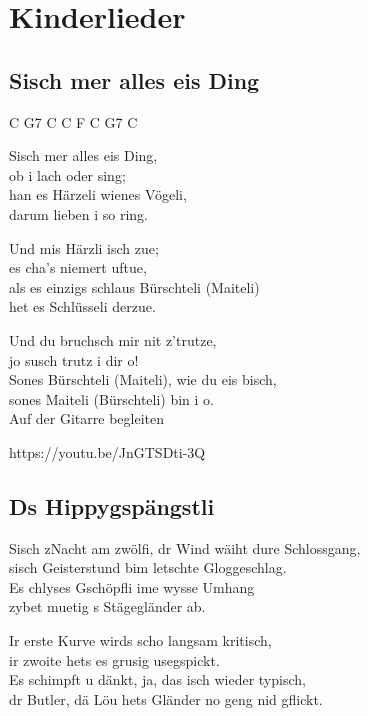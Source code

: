 \documentclass[
  letterpaper,
]{scrbook}
\begin{document}
\part{Kinderlieder}

\hypertarget{sisch-mer-alles-eis-ding}{%
\chapter{S\textquotesingle isch mer alles eis
Ding}\label{sisch-mer-alles-eis-ding}}

C G7 C C F C G7 C

S\textquotesingle isch mer alles eis Ding,\\
ob i lach oder sing;\\
han es Härzeli wienes Vögeli,\\
darum lieben i so ring.

Und mis Härzli isch zue;\\
es cha's niemert uftue,\\
als es einzigs schlaus Bürschteli (Maiteli)\\
het es Schlüsseli derzue.

Und du bruchsch mir nit z'trutze,\\
jo susch trutz i dir o!\\
Sones Bürschteli (Maiteli), wie du eis bisch,\\
sones Maiteli (Bürschteli) bin i o.\\
Auf der Gitarre begleiten

https://youtu.be/JnGTSDti-3Q

\hypertarget{ds-hippygspuxe4ngstli}{%
\chapter{Ds Hippygspängstli}\label{ds-hippygspuxe4ngstli}}

S\textquotesingle isch z\textquotesingle Nacht am zwölfi, dr Wind wäiht
dure Schlossgang,\\
s\textquotesingle isch Geisterstund bim letschte Gloggeschlag.\\
Es chlyses Gschöpfli ime wysse Umhang\\
zybet muetig s Stägegländer ab.

Ir erste Kurve wird\textquotesingle s scho langsam kritisch,\\
ir zwoite hets es grusig usegspickt.\\
Es schimpft u dänkt, ja, das isch wieder typisch,\\
dr Butler, dä Löu het\textquotesingle s Gländer no geng nid gflickt.
\end{document}
